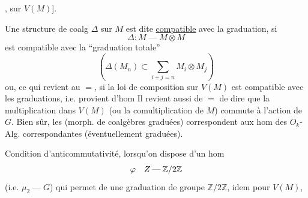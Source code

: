 , sur $V(M)$].

Une structure de coalg $\Delta$ sur $M$ est dite \uline{compatible} avec la graduation, si
\[
\Delta:M\mathbin{\text{---}}M\otimes M
\]
est compatible avec la ``graduation totale''
\[
\left(\Delta(M_n)\subset\sum_{i+j=n}M_i\otimes M_j\right)
\]
ou, ce qui revient au $=$, si la loi de composition sur $V(M)$ est compatible avec les graduations, i.e. provient d'hom
Il revient aussi de $=$ de dire que la multiplication dans $V(M)$ (ou la comultiplication de $M$) commute à l'action de $G$.
Bien sûr, les (morph. de coalgèbres graduées) correspondent aux hom des $O_k$-Alg. correspondantes (éventuellement graduées).

Condition d'anticommutativité, lorsqu'on dispose d'un hom
\[
{{\varphi}}\quad Z\mathbin{\text{---}}\mathbb{Z}/2\mathbb{Z}
\]
(i.e. $\mu_2\mathbin{\text{---}}G$) qui permet de  une graduation de  groupe $\mathbb{Z}/2\mathbb{Z}$, idem pour $V(M)$,
